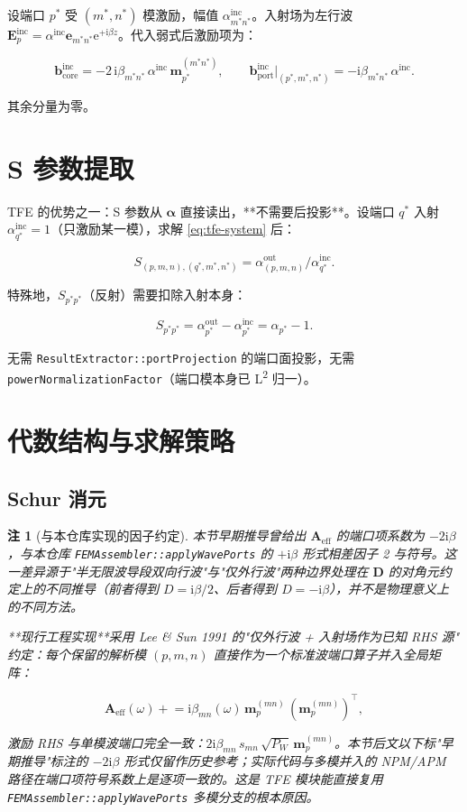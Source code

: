 \documentclass[11pt,a4paper]{ctexart}
\newcommand{\im}{\mathrm{i}}
\newtheorem{remark}{注}
\begin{document}
设端口 $p^*$ 受 $(m^*, n^*)$ 模激励，幅值 $\alpha^{\text{inc}}_{m^*n^*}$。入射场为左行波 $\bm E_p^{\text{inc}} = \alpha^{\text{inc}} \bm e_{m^*n^*} \mathrm{e}^{+\im\beta z}$。代入弱式后激励项为：

\[
  \bm b_{\text{core}}^{\text{inc}} = -2\,\im\beta_{m^*n^*}\,\alpha^{\text{inc}}\,\bm m_{p^*}^{(m^*n^*)},
  \qquad
  \bm b_{\text{port}}^{\text{inc}} \big|_{(p^*, m^*, n^*)} = -\im\beta_{m^*n^*}\,\alpha^{\text{inc}}.
\]

其余分量为零。

\section{S 参数提取}

TFE 的优势之一：S 参数从 $\bm \alpha$ 直接读出，**不需要后投影**。设端口 $q^*$ 入射 $\alpha_{q^*}^{\text{inc}} = 1$（只激励某一模），求解 \eqref{eq:tfe-system} 后：

\[
  S_{(p, m, n), (q^*, m^*, n^*)} = \alpha_{(p, m, n)}^{\text{out}} \big/ \alpha_{q^*}^{\text{inc}}.
\]

特殊地，$S_{p^* p^*}$（反射）需要扣除入射本身：

\[
  S_{p^* p^*} = \alpha_{p^*}^{\text{out}} - \alpha_{p^*}^{\text{inc}} = \alpha_{p^*} - 1.
\]

无需 \texttt{ResultExtractor::portProjection} 的端口面投影，无需 \texttt{powerNormalizationFactor}（端口模本身已 L\textsuperscript{2} 归一）。

\section{代数结构与求解策略}

\subsection{Schur 消元}

\begin{remark}[与本仓库实现的因子约定]
本节早期推导曾给出 $\bm A_{\text{eff}}$ 的端口项系数为 $-2\im\beta$，与本仓库 \texttt{FEMAssembler::applyWavePorts} 的 $+\im\beta$ 形式相差因子 2 与符号。这一差异源于"半无限波导段双向行波"与"仅外行波"两种边界处理在 $\bm D$ 的对角元约定上的不同推导（前者得到 $D = \im\beta/2$、后者得到 $D = -\im\beta$），并不是物理意义上的不同方法。

**现行工程实现**采用 \emph{Lee \& Sun 1991 的"仅外行波 + 入射场作为已知 RHS 源"} 约定：每个保留的解析模 $(p, m, n)$ 直接作为一个标准波端口算子并入全局矩阵：

\[
  \bm A_{\text{eff}}(\omega) \mathrel{+}= \im\beta_{mn}(\omega)\,\bm m_p^{(mn)}\,(\bm m_p^{(mn)})^{\!\top},
\]

激励 RHS 与单模波端口完全一致：$2\im\beta_{mn}\,s_{mn}\,\sqrt{P_W}\,\bm m_p^{(mn)}$。本节后文以下标"早期推导"标注的 $-2\im\beta$ 形式仅留作历史参考；实际代码与多模并入的 NPM/APM 路径在端口项符号系数上是\emph{逐项一致}的。这是 TFE 模块能直接复用 \texttt{FEMAssembler::applyWavePorts} 多模分支的根本原因。
\end{remark}
\end{document}
